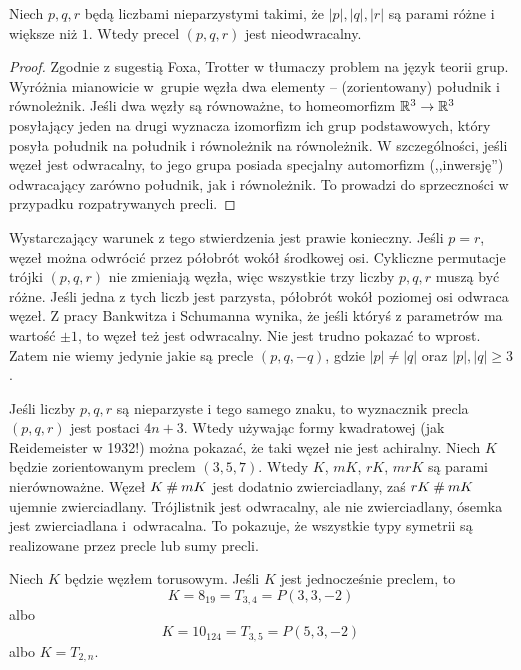 \begin{proposition}[Trotter, 1963] \label{trotter}
    Niech $p, q, r$ będą liczbami nieparzystymi takimi, że $|p|, |q|, |r|$ są parami różne i większe niż $1$.
    Wtedy precel $(p, q, r)$ jest nieodwracalny.
\end{proposition}

\begin{proof}
    Zgodnie z sugestią Foxa, Trotter w \cite{trotter63} tłumaczy problem na język teorii grup.
    Wyróżnia mianowicie w~grupie węzła dwa elementy -- (zorientowany) południk i równoleżnik.
    Jeśli dwa węzły są równoważne, to homeomorfizm $\mathbb R^3 \to \mathbb R^3$ posyłający jeden na drugi wyznacza izomorfizm ich grup podstawowych, który posyła południk na południk i równoleżnik na równoleżnik.
    W szczególności, jeśli węzeł jest odwracalny, to jego grupa posiada specjalny automorfizm (,,inwersję'') odwracający zarówno południk, jak i równoleżnik.
    To prowadzi do sprzeczności w przypadku rozpatrywanych precli.
\end{proof}

Wystarczający warunek z tego stwierdzenia jest prawie konieczny.
Jeśli $p = r$, węzeł można odwrócić przez półobrót wokół środkowej osi.
Cykliczne permutacje trójki $(p, q, r)$ nie zmieniają węzła, więc wszystkie trzy liczby $p, q, r$ muszą być różne.
Jeśli jedna z tych liczb jest parzysta, półobrót wokół poziomej osi odwraca węzeł.
Z pracy Bankwitza i Schumanna wynika, że jeśli któryś z parametrów ma wartość $\pm 1$, to węzeł też jest odwracalny.
Nie jest trudno pokazać to wprost.
Zatem nie wiemy jedynie jakie są precle $(p, q, -q)$, gdzie $|p| \neq |q|$ oraz $|p|, |q| \ge 3$.

Jeśli liczby $p, q, r$ są nieparzyste i tego samego znaku, to wyznacznik precla $(p, q, r)$ jest postaci $4n+3$.
Wtedy używając formy kwadratowej (jak Reidemeister w 1932!) można pokazać, że taki węzeł nie jest achiralny.
Niech $K$ będzie zorientowanym preclem $(3, 5, 7)$.
Wtedy $K$, $mK$, $rK$, $mrK$ są parami nierównoważne.
Węzeł $K \mathbin{\#} mK$ jest dodatnio zwierciadlany, zaś $rK \mathbin{\#} mK$ ujemnie zwierciadlany.
Trójlistnik jest odwracalny, ale nie zwierciadlany, ósemka jest zwierciadlana i~odwracalna.
To pokazuje, że wszystkie typy symetrii są realizowane przez precle lub sumy precli.

\begin{proposition}
    Niech $K$ będzie węzłem torusowym.
    Jeśli $K$ jest jednocześnie preclem, to
    \begin{equation}
        K = 8_{19} = T_{3,4} = P(3,3,-2)
    \end{equation}
    albo
    \begin{equation}
        K = 10_124 = T_{3,5} = P(5,3,-2)
    \end{equation}
    albo $K = T_{2,n}$.
\end{proposition}

